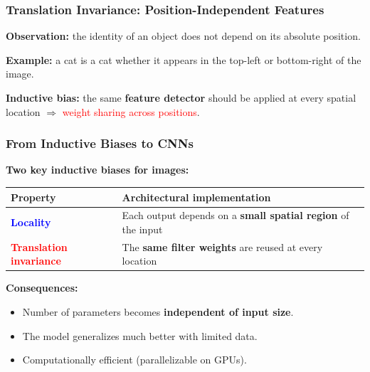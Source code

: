 \documentclass[notes,11pt, aspectratio=169]{beamer}
\begin{document}
\begin{frame}
\frametitle{Translation Invariance: Position-Independent Features}

\textbf{Observation:} the identity of an object does not depend on its absolute position.

\vspace{6pt}
\begin{center}
\end{center}

\vspace{6pt}
\textbf{Example:} a cat is a cat whether it appears in the top-left or bottom-right of the image.

\vspace{8pt}
\textbf{Inductive bias:} the same \textbf{feature detector} should be applied at every spatial location $\Rightarrow$ \textcolor{red}{weight sharing across positions}.
\end{frame}

\begin{frame}
\frametitle{From Inductive Biases to CNNs}

\textbf{Two key inductive biases for images:}

\vspace{6pt}
\begin{center}
\renewcommand{\arraystretch}{1.4}
\begin{tabular}{ll}
\toprule
\textbf{Property} & \textbf{Architectural implementation} \\
\midrule
\textcolor{blue}{\textbf{Locality}} & Each output depends on a \textbf{small spatial region} of the input \\
\textcolor{red}{\textbf{Translation invariance}} & The \textbf{same filter weights} are reused at every location \\
\bottomrule
\end{tabular}
\end{center}

\vspace{10pt}
\begin{center}
\end{center}

\vspace{8pt}
\textbf{Consequences:}
\begin{itemize}
    \item Number of parameters becomes \textbf{independent of input size}.
    \item The model generalizes much better with limited data.
    \item Computationally efficient (parallelizable on GPUs).
\end{itemize}
\end{frame}
\end{document}
